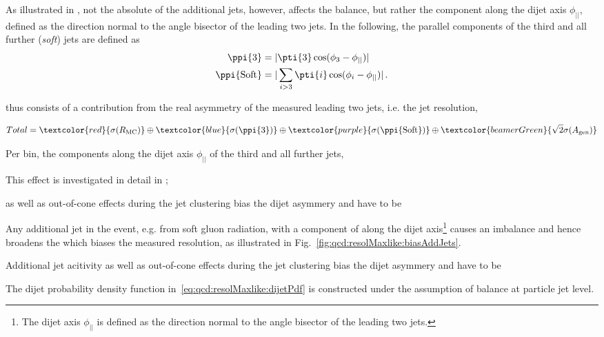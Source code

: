 As illustrated in , not the absolute \pt of the additional jets, however, affects the balance, but rather the component along the dijet axis $\phi_{||}$, defined as the direction normal to the angle bisector of the leading two jets.
In the following, the parallel \pt components of the third and all further (\textit{soft}) jets are defined as
\begin{align}
  \begin{split}
    \ppi{3}           & =  |\pti{3}\cos(\phi_{3}-\phi_{||})| \\
    \ppi{\text{Soft}} & =  |\sum_{i>3}\pti{i}\cos(\phi_{i}-\phi_{||})| \,.
  \end{split}
\end{align}

 thus consists of a contribution from the real asymmetry of the measured leading two jets, i.e. the jet resolution, 

\begin{equation*}
  Total = \textcolor{red}{\sigma(R_{\text{MC}})} \oplus \textcolor{blue}{\sigma(\ppi{3})} \oplus \textcolor{purple}{\sigma(\ppi{\text{Soft}})} \oplus \textcolor{beamerGreen}{\sqrt{2}\sigma(A_\text{gen})}
\end{equation*}


Per bin, the \pt components along the dijet axis $\phi_{||}$ of the third and all further jets,



This effect is investigated in detail in \qfig{};


 as
well as out-of-cone effects during the jet clustering bias the dijet asymmery and have to be


Any additional jet in the event, e.g. from soft gluon radiation, with a component of \pt along the dijet
axis\footnote{The dijet axis $\phi_{||}$ is defined as the direction normal to the angle bisector of the leading two jets.} causes an imbalance and hence broadens the  which biases the measured resolution, as
illustrated in Fig.~\ref{fig:qcd:resolMaxlike:biasAddJets}.


Additional jet acitivity as
well as out-of-cone effects during the jet clustering bias the dijet asymmery and have to be


The dijet probability density function
in~\eqref{eq:qcd:resolMaxlike:dijetPdf} is constructed under the
assumption of \pt balance at particle jet level.

